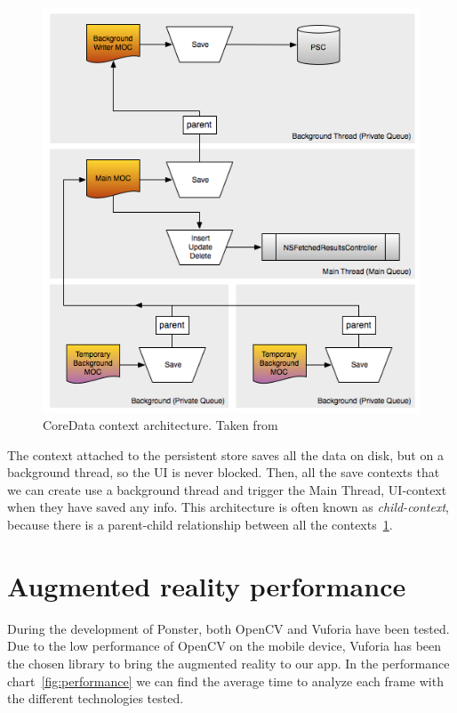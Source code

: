 \begin{figure}
\centering
\includegraphics[scale=0.55]{img/coredataarch.png}
\caption{\label{fig:coredataarch}CoreData context architecture. Taken
  from~\cite{coredataarch}} 
\end{figure} 

The context attached to the persistent store saves all the data on disk, but on a
background thread, so the UI is never blocked. Then, all the save contexts that we
can create use a background thread and trigger the Main Thread, UI-context when they
have saved any info. This architecture is often known as \emph{child-context},
because there is a parent-child relationship between all the
contexts~\ref{fig:coredataarch}. 

\section{Augmented reality performance}
During the development of Ponster, both OpenCV and Vuforia have been tested. Due to
the low performance of OpenCV on the mobile device, Vuforia has been the chosen library
to bring the augmented reality to our app. In the performance
chart~\ref{fig:performance} we can find the average time to analyze each frame with
the different technologies tested. 

